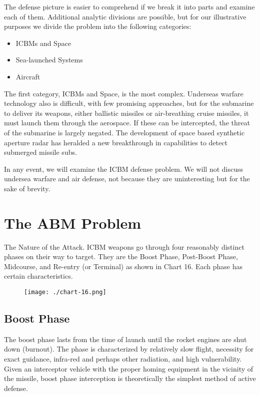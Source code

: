 The defense picture is easier to comprehend if we break it into parts and examine each of them. Additional analytic divisions are possible, but for our illustrative purposes we divide the problem into the following categories:
\begin{itemize}
    \item ICBMs and Space
    \item Sea-launched Systems
    \item Aircraft
\end{itemize}

The first category, ICBMs and Space, is the most complex. Underseas warfare technology also is difficult, with few promising approaches, but for the submarine to deliver its weapons, either ballistic missiles or air-breathing cruise missiles, it must launch them through the aerospace. If these can be intercepted, the threat of the submarine is largely negated. The development of space based synthetic aperture radar has heralded a new breakthrough in capabilities to detect submerged missile subs.

In any event, we will examine the ICBM defense problem. We will not discuss undersea warfare and air defense, not because they are uninteresting but for the sake of brevity.

\section{The ABM Problem}
The Nature of the Attack. ICBM weapons go through four reasonably distinct phases on their way to target. They are the Boost Phase, Post-Boost Phase, Midcourse, and Re-entry (or Terminal) as shown in Chart 16. Each phase has certain characteristics.

\begin{figure}[h!]
    \centering
    \texttt{[image: ./chart-16.png]}
    \label{fig:icbm-traj}
\end{figure}

\subsection{Boost Phase}
The boost phase lasts from the time of launch until the rocket engines are shut down (burnout). The phase is characterized by relatively slow flight, necessity for exact guidance, infra-red and perhaps other radiation, and high vulnerability. Given an interceptor vehicle with the proper homing equipment in the vicinity of the missile, boost phase interception is theoretically the simplest method of active defense.

